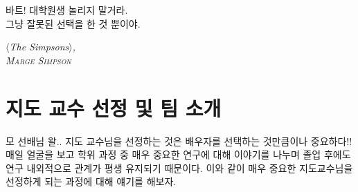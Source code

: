 \epigraph{바트! 대학원생 놀리지 말거라.\\그냥 잘못된 선택을 한 것 뿐이야.}
{\textit{$\langle$The Simpsons$\rangle$,\\ \textsc{Marge Simpson}}}

\section{지도 교수 선정 및 팀 소개}
모 선배님 왈.. 지도 교수님을 선정하는 것은 배우자를 선택하는 것만큼이나
중요하다!! 매일 얼굴을 보고 학위 과정 중 매우 중요한 연구에 대해 이야기를 나누며
졸업 후에도 연구 내외적으로 관계가 평생 유지되기 때문이다. 이와 같이 매우 중요한
지도교수님을 선정하게 되는 과정에 대해 얘기를 해보자.

